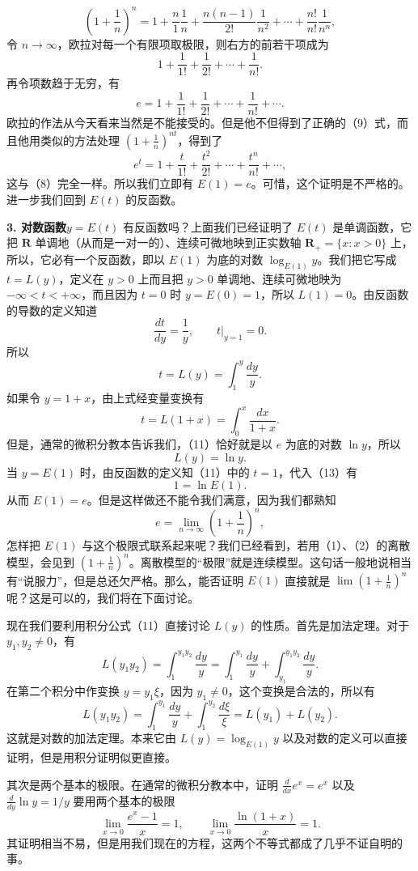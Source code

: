\[
\left(1+\frac1n\right)^n=1+\frac n1\frac1n+\frac{n(n-1)}{2!}\frac1{n^2}+\cdots+\frac{n!}{n!}\frac1{n^n},
\]
令 $n\to\infty$，欧拉对每一个有限项取极限，则右方的前若干项成为
\[
1+\frac1{1!}+\frac1{2!}+\cdots+\frac1{n!}.
\]
再令项数趋于无穷，有
\[
e=1+\frac1{1!}+\frac1{2!}+\cdots+\frac1{n!}+\cdots. \tag{9}
\]
欧拉的作法从今天看来当然是不能接受的。但是他不但得到了正确的（9）式，而且他用类似的方法处理 $\left(1+\frac1n\right)^{nt}$，得到了
\[
e^t=1+\frac t{1!}+\frac{t^2}{2!}+\cdots+\frac{t^n}{n!}+\cdots, \tag{10}
\]
这与（8）完全一样。所以我们立即有 $E(1)=e$。可惜，这个证明是不严格的。进一步我们回到 $E(t)$ 的反函数。

\textbf{3. 对数函数}\quad $y=E(t)$ 有反函数吗？上面我们已经证明了 $E(t)$ 是单调函数，它把 $\mathbf R$ 单调地（从而是一对一的）、连续可微地映到正实数轴 $\mathbf R_+=\{x:x>0\}$ 上，所以，它必有一个反函数，即以 $E(1)$ 为底的对数 $\log_{E(1)}y$。我们把它写成 $t=L(y)$，定义在 $y>0$ 上而且把 $y>0$ 单调地、连续可微地映为 $-\infty<t<+\infty$，而且因为 $t=0$ 时 $y=E(0)=1$，所以 $L(1)=0$。由反函数的导数的定义知道
\[
\frac{dt}{dy}=\frac1y,\qquad t\big|_{y=1}=0.
\]
所以
\[
t=L(y)=\int_1^y\frac{dy}{y}. \tag{11}
\]
如果令 $y=1+x$，由上式经变量变换有
\[
t=L(1+x)=\int_0^x\frac{dx}{1+x}. \tag{12}
\]
但是，通常的微积分教本告诉我们，（11）恰好就是以 $e$ 为底的对数 $\ln y$，所以
\[
L(y)=\ln y. \tag{13}
\]
当 $y=E(1)$ 时，由反函数的定义知（11）中的 $t=1$，代入（13）有
\[
1=\ln E(1).
\]
从而 $E(1)=e$。但是这样做还不能令我们满意，因为我们都熟知
\[
e=\lim_{n\to\infty}\left(1+\frac1n\right)^n,
\]
怎样把 $E(1)$ 与这个极限式联系起来呢？我们已经看到，若用（1）、（2）的离散模型，会见到 $\left(1+\frac1n\right)^n$。离散模型的“极限”就是连续模型。这句话一般地说相当有“说服力”，但是总还欠严格。那么，能否证明 $E(1)$ 直接就是 $\lim\left(1+\frac1n\right)^n$ 呢？这是可以的，我们将在下面讨论。

现在我们要利用积分公式（11）直接讨论 $L(y)$ 的性质。首先是加法定理。对于 $y_1,y_2\ne0$，有
\[
L(y_1y_2)=\int_1^{y_1y_2}\frac{dy}{y}=\int_1^{y_1}\frac{dy}{y}+\int_{y_1}^{y_1y_2}\frac{dy}{y}.
\]
在第二个积分中作变换 $y=y_1\xi$，因为 $y_1\ne0$，这个变换是合法的，所以有
\[
L(y_1y_2)=\int_1^{y_1}\frac{dy}{y}+\int_1^{y_2}\frac{d\xi}{\xi}=L(y_1)+L(y_2).
\]
这就是对数的加法定理。本来它由 $L(y)=\log_{E(1)}y$ 以及对数的定义可以直接证明，但是用积分证明似更直接。

其次是两个基本的极限。在通常的微积分教本中，证明 $\frac{d}{dx}e^x=e^x$ 以及 $\frac{d}{dy}\ln y=1/y$ 要用两个基本的极限
\[
\lim_{x\to0}\frac{e^x-1}{x}=1,
\qquad
\lim_{x\to0}\frac{\ln(1+x)}{x}=1.
\]
其证明相当不易，但是用我们现在的方程，这两个不等式都成了几乎不证自明的事。

